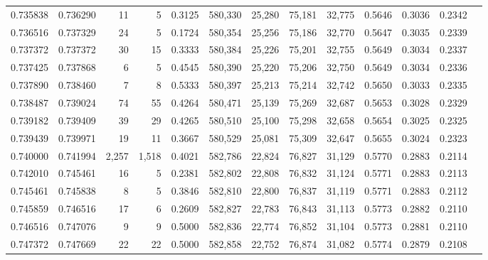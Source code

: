 \begin{tabular}{rrrrrrrrrrrrr}
0.735838 & 0.736290 &     11 &     5 &                                     0.3125 & 580,330 &  25,280 &  75,181 &  32,775 & 0.5646 & 0.3036 & 0.2342 \\
0.736516 & 0.737329 &     24 &     5 &                                     0.1724 & 580,354 &  25,256 &  75,186 &  32,770 & 0.5647 & 0.3035 & 0.2339 \\
0.737372 & 0.737372 &     30 &    15 &                                     0.3333 & 580,384 &  25,226 &  75,201 &  32,755 & 0.5649 & 0.3034 & 0.2337 \\
0.737425 & 0.737868 &      6 &     5 &                                     0.4545 & 580,390 &  25,220 &  75,206 &  32,750 & 0.5649 & 0.3034 & 0.2336 \\
0.737890 & 0.738460 &      7 &     8 &                                     0.5333 & 580,397 &  25,213 &  75,214 &  32,742 & 0.5650 & 0.3033 & 0.2335 \\
0.738487 & 0.739024 &     74 &    55 &                                     0.4264 & 580,471 &  25,139 &  75,269 &  32,687 & 0.5653 & 0.3028 & 0.2329 \\
0.739182 & 0.739409 &     39 &    29 &                                     0.4265 & 580,510 &  25,100 &  75,298 &  32,658 & 0.5654 & 0.3025 & 0.2325 \\
0.739439 & 0.739971 &     19 &    11 &                                     0.3667 & 580,529 &  25,081 &  75,309 &  32,647 & 0.5655 & 0.3024 & 0.2323 \\
0.740000 & 0.741994 &  2,257 & 1,518 &                                     0.4021 & 582,786 &  22,824 &  76,827 &  31,129 & 0.5770 & 0.2883 & 0.2114 \\
0.742010 & 0.745461 &     16 &     5 &                                     0.2381 & 582,802 &  22,808 &  76,832 &  31,124 & 0.5771 & 0.2883 & 0.2113 \\
0.745461 & 0.745838 &      8 &     5 &                                     0.3846 & 582,810 &  22,800 &  76,837 &  31,119 & 0.5771 & 0.2883 & 0.2112 \\
0.745859 & 0.746516 &     17 &     6 &                                     0.2609 & 582,827 &  22,783 &  76,843 &  31,113 & 0.5773 & 0.2882 & 0.2110 \\
0.746516 & 0.747076 &      9 &     9 &                                     0.5000 & 582,836 &  22,774 &  76,852 &  31,104 & 0.5773 & 0.2881 & 0.2110 \\
0.747372 & 0.747669 &     22 &    22 &                                     0.5000 & 582,858 &  22,752 &  76,874 &  31,082 & 0.5774 & 0.2879 & 0.2108 \\

\end{tabular}
